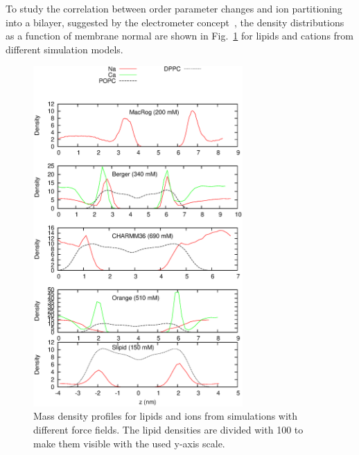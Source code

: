 \documentclass[pre,aps,floatfix,authordate1-4,twocolumn]{revtex4-1}
\begin{document}
To study the correlation between order parameter changes and ion partitioning into a bilayer, 
suggested by the electrometer concept~\cite{akutsu81,altenbach84,seelig87,scherer89}, the density distributions as a function of membrane normal 
are shown in Fig.~\ref{IONdensCOMP} for lipids and cations from different simulation models. 
\begin{figure}[]
  \centering
  \includegraphics[width=8cm]{../Fig/IONdensities.eps}
  \caption{\label{IONdensCOMP}
    Mass density profiles for lipids and ions from simulations with different force fields. 
    The lipid densities are divided with 100 to make them visible with the used y-axis scale.
  }
\end{figure}
\end{document}
